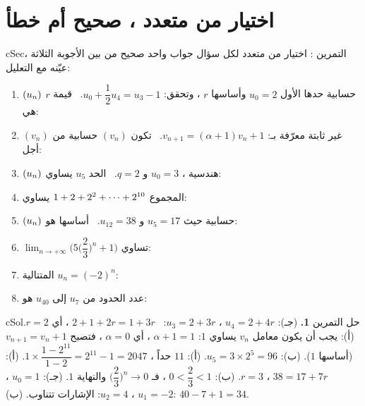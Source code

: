 \documentclass[12pt,a4paper]{article}
\newenvironment{BOX}[2]{\begin{otherlanguage}{english}\begin{arbox}{#1}{#2}}{\end{arbox}\end{otherlanguage}}
\newcounter{exo}
\newenvironment{tamrin}[1]{\stepcounter{exo}\begin{BOX}{cSec}{التمرين \theexo: #1}}{\end{BOX}}
\newenvironment{hal}{\Needspace{12\baselineskip}\begin{otherlanguage}{english}\begin{arbox}[breakable]{cSol}{حل التمرين \theexo}}{\end{arbox}\end{otherlanguage}}
\renewcommand{\cdots}{\mathinner{\cdotp\cdotp\cdotp}}
\newcommand{\limn}{\displaystyle\lim_{n\to+\infty}}
\begin{document}
\section{اختيار من متعدد ، صحيح أم خطأ}
\begin{tamrin}{اختيار من متعدد}
لكل سؤال جواب واحد صحيح من بين الأجوبة الثلاثة ، عيّنه مع التعليل:
\begin{enumerate}
\item $(u_n)$ حسابية حدها الأول $u_0=2$ وأساسها $r$ ، وتحقق: $u_0+\dfrac12u_4=u_3-1$. \ قيمة $r$ هي:
\item $(v_n)$ غير ثابتة معرّفة بـ: $v_{n+1}=(\alpha+1)v_n+1$. \ تكون $(v_n)$ حسابية من أجل:
\item $(u_n)$ هندسية ، $u_0=3$ و $q=2$. \ الحد $u_5$ يساوي:
\item المجموع $1+2+2^2+\cdots+2^{10}$ يساوي:
\item $(u_n)$ حسابية حيث $u_5=17$ و $u_{12}=38$. \ أساسها هو:
\item $\limn\Big(5\Big(\dfrac23\Big)^n+1\Big)$ تساوي:
\item المتتالية $u_n=(-2)^n$:
\item عدد الحدود من $u_7$ إلى $u_{40}$ هو:
\end{enumerate}
\end{tamrin}
\begin{hal}
\textbf{1.} (جـ): $u_4=2+4r$ ، $u_3=2+3r$: \ $2+1+2r=1+3r$ ، أي $r=2$.
 (أ): يجب أن يكون معامل $v_n$ يساوي $1$: $\alpha+1=1$ ، أي $\alpha=0$ ، فتصبح $v_{n+1}=v_n+1$ (أساسها $1$).
 (ب): $u_5=3\times2^5=96$.
 (أ): $11$ حداً ، $1\times\dfrac{1-2^{11}}{1-2}=2^{11}-1=2047$.
 (أ): $38=17+7r$ ، $r=3$.
 (ب): $0<\dfrac23<1$ ، فـ $\Big(\dfrac23\Big)^n\to0$ والنهاية $1$.
 (جـ): $u_0=1$ ، $u_1=-2$ ، $u_2=4$: الإشارات تتناوب.
 (ب): $40-7+1=34$.
\end{hal}
\end{document}
